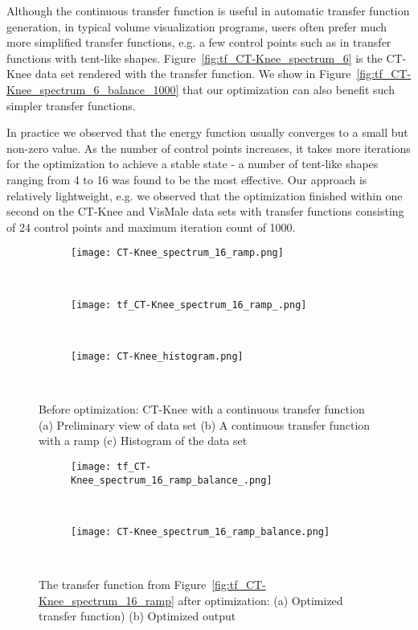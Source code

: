 Although the continuous transfer function is useful in automatic transfer function generation, in typical volume visualization programs, users often prefer much more simplified transfer functions, e.g. a few control points such as in transfer functions with tent-like shapes. Figure~\ref{fig:tf_CT-Knee_spectrum_6} is the CT-Knee data set rendered with the transfer function. We show in Figure~\ref{fig:tf_CT-Knee_spectrum_6_balance_1000} that our optimization can also benefit such simpler transfer functions.

In practice we observed that the energy function usually converges to a small but non-zero value. As the number of control points increases, it takes more iterations for the optimization to achieve a stable state - a number of tent-like shapes ranging from 4 to 16 was found to be the most effective.
Our approach is relatively lightweight, e.g. we observed that the optimization finished within one second on the CT-Knee and VisMale data sets with transfer functions consisting of 24 control points and maximum iteration count of 1000.

\begin{figure}
\centering

\begin{subfigure}{0.15\textwidth}
\texttt{[image: CT-Knee\_spectrum\_16\_ramp.png]}
\caption{~}
\end{subfigure}
\begin{subfigure}{0.15\textwidth}
\texttt{[image: tf\_CT-Knee\_spectrum\_16\_ramp\_.png]}
\caption{~}
\label{fig:tf_CT-Knee_spectrum_16_ramp_}
\end{subfigure}
\begin{subfigure}{0.15\textwidth}
\texttt{[image: CT-Knee\_histogram.png]}
\caption{~}
\label{fig:CT-Knee_histogram}
\end{subfigure}
\caption{Before optimization: CT-Knee with a continuous transfer 
function (a) Preliminary view of data set (b) A continuous transfer 
function with a ramp (c) Histogram of the data set}
\label{fig:tf_CT-Knee_spectrum_16_ramp}

\begin{subfigure}{0.15\textwidth}
\texttt{[image: tf\_CT-Knee\_spectrum\_16\_ramp\_balance\_.png]}
\caption{~}
\end{subfigure}
\begin{subfigure}{0.15\textwidth}
\texttt{[image: CT-Knee\_spectrum\_16\_ramp\_balance.png]}    
\caption{~}
\end{subfigure}
\caption{The transfer function from Figure~\ref{fig:tf_CT-Knee_spectrum_16_ramp} after optimization: (a) Optimized transfer function) (b) Optimized output}
\label{fig:tf_CT-Knee_spectrum_16_ramp_balance}

\end{figure}

